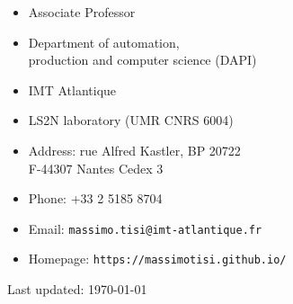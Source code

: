 {\huge \name}


\vspace{0.25in}
\begin{minipage}[t]{0.5\textwidth}
  \begin{itemize}
  \item Associate Professor
  \item Department of automation,\\
    production and computer science (DAPI)
  \item IMT Atlantique
  \item LS2N laboratory (UMR CNRS 6004)
  \end{itemize}

\end{minipage}
\begin{minipage}[t]{0.5\textwidth}
  \begin{itemize}
  \item Address: rue Alfred Kastler, BP 20722 \\
  F-44307 Nantes Cedex 3
  \item Phone: +33 2 5185 8704
  \item Email: \texttt{massimo.tisi@imt-atlantique.fr}
  \item Homepage: \texttt{https://massimotisi.github.io/}
  \end{itemize}
\end{minipage}

\vfill
\tableofcontents

\vfill
\begin{center}
  \begin{small}
    Last updated: \today
  \end{small}
\end{center}
